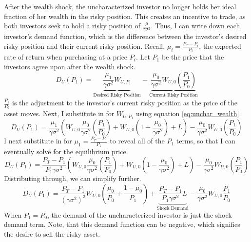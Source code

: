 \documentclass[12pt]{article}
\begin{document}
After the wealth shock, the uncharacterized investor no longer holds her ideal fraction of her wealth in the risky position. This creates an incentive to trade, as both investors seek to hold a risky position of $\frac{\mu}{\gamma\sigma^2}$. Thus, I can write down each investor's demand function, which is the difference between the investor's desired risky position and their current risky position. Recall, $\mu_i = \frac{P_T-P_i}{P_i}$, the expected rate of return when purchasing at a price $P_i$. Let $P_1$ be the price that the investors agree upon after the wealth shock. 
\begin{equation}
    D_U(P_1) = \underbrace{\frac{\mu_1}{\gamma \sigma^2}W_{U,P_1}}_\text{Desired Risky Position} - \underbrace{\frac{\mu_0}{\gamma \sigma^2}W_{U,0}\left(\frac{P_1}{P_0}\right)}_\text{Current Risky Position}
\end{equation}
$\frac{P_1}{P_0}$ is the adjustment to the investor's current risky position as the price of the asset moves. Next, I substitute in for $W_{U,P_1}$ using equation \eqref{eq:unchar_wealth}.
\begin{equation}
    D_U(P_1) = \frac{\mu_1}{\gamma \sigma^2}\left(W_{U,0}\frac{\mu_0}{\gamma\sigma^2} \left(\frac{P_1}{P_0}\right) + W_{U,0}\left(1-\frac{\mu_0}{\gamma\sigma^2} \right) + L\right) -\frac{\mu_0}{\gamma \sigma^2}W_{U,0}\left(\frac{P_1}{P_0}\right)
\end{equation}
I next substitute in for $\mu_1 = \frac{P_T - P_1}{P_1}$ to reveal all of the $P_1$ terms, so that I can eventually solve for the equilibrium price.
\begin{equation}
    D_U(P_1) = \frac{P_T - P_1}{P_1\gamma \sigma^2}\left(W_{U,0}\frac{\mu_0}{\gamma\sigma^2} \left(\frac{P_1}{P_0}\right) + W_{U,0}\left(1-\frac{\mu_0}{\gamma\sigma^2} \right) + L\right) -\frac{\mu_0}{\gamma \sigma^2}W_{U,0}\left(\frac{P_1}{P_0}\right)
\end{equation}
Distributing through, we can simplify further.
\begin{equation}
    D_U(P_1) = \frac{P_T - P_1}{(\gamma \sigma^2)^2}W_{U,0}\left(\frac{\mu_0}{P_0} + \frac{1- \mu_0}{P_1}\right) + \underbrace{\frac{P_T - P_1}{P_1\gamma\sigma^2}L}_{\text{Shock Demand}} - \frac{\mu_0}{\gamma \sigma^2}W_{U,0}\frac{P_1}{P_0}
    \label{eq:simple_unchar_demand}
\end{equation}
When $P_1 = P_0$, the demand of the uncharacterized investor is just the shock demand term. Note, that this demand function can be negative, which signifies the desire to sell the risky asset. 
\end{document}
